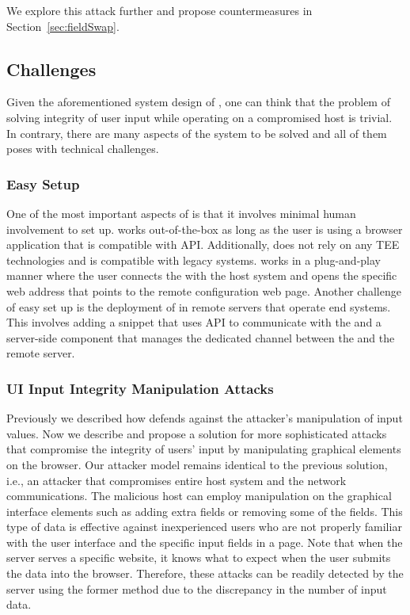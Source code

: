 We explore this attack further and propose countermeasures in Section~\ref{sec:fieldSwap}.
\fi

\subsection{Challenges}
\label{sec:systemDesign:challenges}

Given the aforementioned system design of \tool, one can think that the problem of solving integrity of user input while operating on a compromised host is trivial. In contrary, there are many aspects of the system to be solved and all of them poses with technical challenges.

\subsubsection{Easy Setup}
\label{sec:systemDesign:challenges:setup}

One of the most important aspects of \tool is that it involves minimal human involvement to set up. \tool works out-of-the-box as long as the user is using a browser application that is compatible with \webusb API. Additionally, \tool does not rely on any TEE technologies and is compatible with legacy systems. \tool works in a plug-and-play manner where the user connects the \device with the host system and opens the specific web address that points to the remote configuration web page. Another challenge of easy set up is the deployment of \tool in remote servers that operate end systems. This involves adding a \js snippet that uses \webusb API to communicate with the \device and a \tool server-side component that manages the dedicated \tls channel between the \device and the remote server.  


\subsubsection{UI Input Integrity Manipulation Attacks}
\label{sec:systemDesign:challenges:uiAttack}

Previously we described how \device defends against the attacker's manipulation of input values. Now we describe and propose a solution for more sophisticated attacks that compromise the integrity of users' input by manipulating graphical elements on the browser. Our attacker model remains identical to the previous solution, i.e., an attacker that compromises entire host system and the network communications. The malicious host can employ manipulation on the graphical interface elements such as adding extra fields or removing some of the fields. This type of data is effective against inexperienced users who are not properly familiar with the user interface and the specific input fields in a page. Note that when the server serves a specific website, it knows what to expect when the user submits the data into the browser. Therefore, these attacks can be readily detected by the server using the former method due to the discrepancy in the number of input data.  

